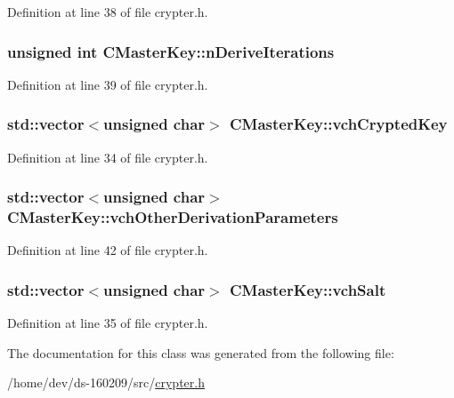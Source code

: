 Definition at line 38 of file crypter.\+h.

\hypertarget{class_c_master_key_aec53e0be82d1053cf5a70a67fd4cc25d}{}
\subsubsection[{n\+Derive\+Iterations}]{\setlength{\rightskip}{0pt plus 5cm}unsigned int C\+Master\+Key\+::n\+Derive\+Iterations}\label{class_c_master_key_aec53e0be82d1053cf5a70a67fd4cc25d}


Definition at line 39 of file crypter.\+h.

\hypertarget{class_c_master_key_ab52e0eaabb0eb3af78fc4879c192e163}{}
\subsubsection[{vch\+Crypted\+Key}]{\setlength{\rightskip}{0pt plus 5cm}std\+::vector$<$unsigned char$>$ C\+Master\+Key\+::vch\+Crypted\+Key}\label{class_c_master_key_ab52e0eaabb0eb3af78fc4879c192e163}


Definition at line 34 of file crypter.\+h.

\hypertarget{class_c_master_key_abfd00b311d5e5cf9ae1a6f3877ed35f7}{}
\subsubsection[{vch\+Other\+Derivation\+Parameters}]{\setlength{\rightskip}{0pt plus 5cm}std\+::vector$<$unsigned char$>$ C\+Master\+Key\+::vch\+Other\+Derivation\+Parameters}\label{class_c_master_key_abfd00b311d5e5cf9ae1a6f3877ed35f7}


Definition at line 42 of file crypter.\+h.

\hypertarget{class_c_master_key_a00009f4b4feaa2ebe630a0d7cc854d3a}{}
\subsubsection[{vch\+Salt}]{\setlength{\rightskip}{0pt plus 5cm}std\+::vector$<$unsigned char$>$ C\+Master\+Key\+::vch\+Salt}\label{class_c_master_key_a00009f4b4feaa2ebe630a0d7cc854d3a}


Definition at line 35 of file crypter.\+h.



The documentation for this class was generated from the following file\+:\begin{DoxyCompactItemize}
\item 
/home/dev/ds-\/160209/src/\hyperlink{crypter_8h}{crypter.\+h}\end{DoxyCompactItemize}
